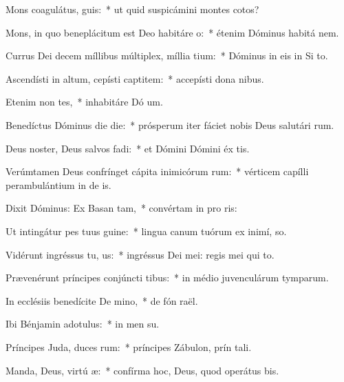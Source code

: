 \item Mons coagulátus,  guis:~* ut quid suspicámini montes cotos?
\item Mons, in quo beneplácitum est Deo habitáre  o:~* étenim Dóminus habitá  nem.
\item Currus Dei decem míllibus múltiplex, míllia tium:~* Dóminus in eis in Si  to.
\item Ascendísti in altum, cepísti captitem:~* accepísti dona  nibus.
\item Etenim non tes,~* inhabitáre Dó um.
\item Benedíctus Dóminus die die:~* prósperum iter fáciet nobis Deus salutári rum.
\item Deus noster, Deus salvos fadi:~* et Dómini Dómini éx tis.
\item Verúmtamen Deus confrínget cápita inimicórum rum:~* vérticem capílli perambulántium in de is.
\item Dixit Dóminus: Ex Basan tam,~* convértam in pro ris:
\item Ut intingátur pes tuus  guine:~* lingua canum tuórum ex inimí,  so.
\item Vidérunt ingréssus tu, us:~* ingréssus Dei mei: regis mei qui   to.
\item Prævenérunt príncipes conjúncti tibus:~* in médio juvenculárum tymparum.
\item In ecclésiis benedícite De mino,~* de fón raël.
\item Ibi Bénjamin adotulus:~* in men su.
\item Príncipes Juda, duces rum:~* príncipes Zábulon, prín tali.
\item Manda, Deus, virtú æ:~* confírma hoc, Deus, quod operátus   bis.
